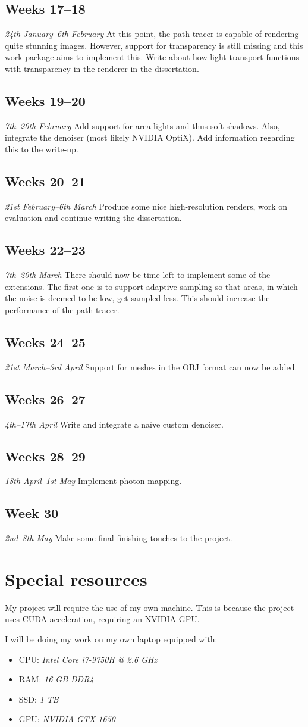 \documentclass[12pt, a4paper]{article}
\newcommand{\newtime}[3]{
    \subsection*{#1}
    \vspace{-\baselineskip}
    \emph{#2}
    \vspace{\baselineskip}
    \newline
    #3
}
\begin{document}
    \newtime{Weeks 17--18}{24th January--6th February}{At this point, the path tracer is capable of rendering quite stunning images. However, support for transparency is still missing and this work package aims to implement this. Write about how light transport functions with transparency in the renderer in the dissertation.}

    \newtime{Weeks 19--20}{7th--20th February}{Add support for area lights and thus soft shadows. Also, integrate the denoiser (most likely NVIDIA OptiX). Add information regarding this to the write-up.}

    \newtime{Weeks 20--21}{21st February--6th March}{Produce some nice high-resolution renders, work on evaluation and continue writing the dissertation.}

    \newtime{Weeks 22--23}{7th--20th March}{There should now be time left to implement some of the extensions. The first one is to support adaptive sampling so that areas, in which the noise is deemed to be low, get sampled less. This should increase the performance of the path tracer.}
    
    \newtime{Weeks 24--25}{21st March--3rd April}{Support for meshes in the OBJ format can now be added.}

    \newtime{Weeks 26--27}{4th--17th April}{Write and integrate a naïve custom denoiser.}

    \newtime{Weeks 28--29}{18th April--1st May}{Implement photon mapping.}

    \newtime{Week 30}{2nd--8th May}{Make some final finishing touches to the project.}

    \section*{Special resources}
    My project will require the use of my own machine. This is because the project uses CUDA-acceleration, requiring an NVIDIA GPU.

    I will be doing my work on my own laptop equipped with:
    \begin{itemize}
        \setlength\itemsep{0.1em}
        \item CPU: \emph{Intel Core i7-9750H @ 2.6 GHz}
        \item RAM: \emph{16 GB DDR4}
        \item SSD: \emph{1 TB}
        \item GPU: \emph{NVIDIA GTX 1650}
    \end{itemize}
    
\end{document}
